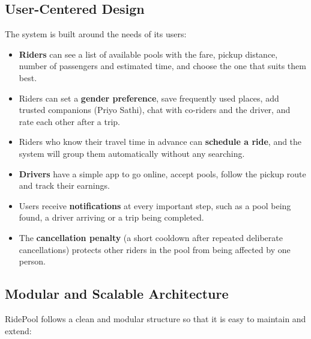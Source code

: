 \subsection{User-Centered Design}

The system is built around the needs of its users:

\begin{itemize}
  \item \textbf{Riders} can see a list of available pools with the fare, pickup
        distance, number of passengers and estimated time, and choose the one
        that suits them best.
  \item Riders can set a \textbf{gender preference}, save frequently used
        places, add trusted companions (Priyo Sathi), chat with co-riders and
        the driver, and rate each other after a trip.
  \item Riders who know their travel time in advance can \textbf{schedule a
        ride}, and the system will group them automatically without any
        searching.
  \item \textbf{Drivers} have a simple app to go online, accept pools, follow
        the pickup route and track their earnings.
  \item Users receive \textbf{notifications} at every important step, such as a
        pool being found, a driver arriving or a trip being completed.
  \item The \textbf{cancellation penalty} (a short cooldown after repeated
        deliberate cancellations) protects other riders in the pool from being
        affected by one person.
\end{itemize}

\subsection{Modular and Scalable Architecture}

RidePool follows a clean and modular structure so that it is easy to maintain
and extend:

